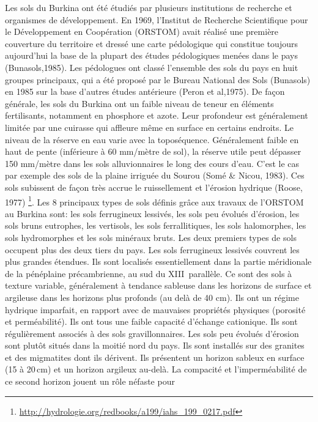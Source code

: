 \documentclass[a4paper,11pt]{article}
\begin{document}
Les sols du Burkina ont été étudiés par plusieurs institutions de
recherche et organismes de développement. En 1969, l'Institut de
Recherche Scientifique pour le Développement en Coopération (ORSTOM)
avait réalisé une première couverture du territoire et dressé une
carte pédologique qui constitue toujours aujourd'hui la base de la
plupart des études pédologiques menées dans le pays
(Bunasols,1985). Les pédologues ont classé l'ensemble des sols du pays
en huit groupes principaux, qui a été proposé par le Bureau National
des Sols (Bunasols) en 1985 sur la base d'autres études antérieure
(Peron et al,1975). De façon générale, les sols du Burkina ont un
faible niveau de teneur en éléments fertilisants, notamment en
phosphore et azote. Leur profondeur est généralement limitée par une
cuirasse qui affleure même en surface en certains endroits. Le niveau
de la réserve en eau varie avec la toposéquence. Généralement faible
en haut de pente (inférieure à 60 mm/mètre de sol), la réserve utile
peut dépasser 150 mm/mètre dans les sols alluvionnaires le long des
cours d'eau. C'est le cas par exemple des sols de la plaine irriguée
du Sourou (Somé \& Nicou, 1983). Ces sols subissent de façon très accrue
le ruissellement et l'érosion hydrique (Roose, 1977)
\footnote{\url{http://hydrologie.org/redbooks/a199/iahs_199_0217.pdf}}. Les
8 principaux types de sols définis grâce aux travaux de l'ORSTOM au
Burkina sont: les sols ferrugineux lessivés, les sols peu évolués
d’érosion, les sols bruns eutrophes, les vertisols, les sols
ferrallitiques, les sols halomorphes, les sols hydromorphes et les
sols minéraux bruts. Les deux premiers types de sols occupent plus des
deux tiers du pays. Les sols ferrugineux lessivés couvrent les plus
grandes étendues. Ils sont localisés essentiellement dans la partie
méridionale de la pénéplaine précambrienne, au sud du XIII\ieme\,
parallèle. Ce sont des sols à texture variable, généralement à
tendance sableuse dans les horizons de surface et argileuse dans les
horizons plus profonds (au delà de 40 cm). Ils ont un régime hydrique
imparfait, en rapport avec de mauvaises propriétés physiques (porosité
et perméabilité). Ils ont tous une faible capacité d’échange
cationique. Ils sont régulièrement associés à des sols
gravillonnaires. Les sols peu évolués d’érosion sont plutôt situés
dans la moitié nord du pays. Ils sont installés sur des granites et
des migmatites dont ils dérivent. Ils présentent un horizon sableux en
surface (15 à 20\,cm) et un horizon argileux au-delà. La compacité et
l’imperméabilité de ce second horizon jouent un rôle néfaste pour
\end{document}
